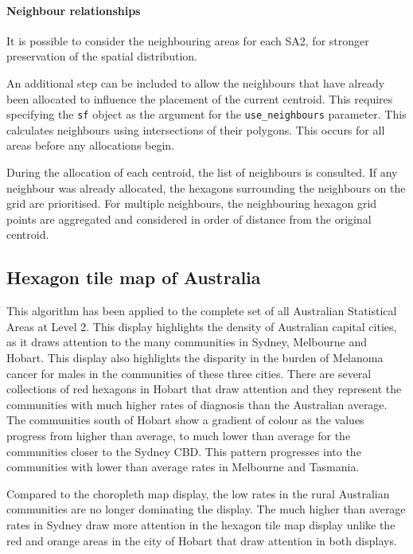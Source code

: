 \hypertarget{neighbour-relationships}{%
\paragraph{Neighbour relationships}\label{neighbour-relationships}}

It is possible to consider the neighbouring areas for each SA2, for
stronger preservation of the spatial distribution.

An additional step can be included to allow the neighbours that have
already been allocated to influence the placement of the current
centroid. This requires specifying the \texttt{sf} object as the
argument for the \texttt{use\_neighbours} parameter. This calculates
neighbours using intersections of their polygons. This occurs for all
areas before any allocations begin.

During the allocation of each centroid, the list of neighbours is
consulted. If any neighbour was already allocated, the hexagons
surrounding the neighbours on the grid are prioritised. For multiple
neighbours, the neighbouring hexagon grid points are aggregated and
considered in order of distance from the original centroid.

\hypertarget{hexagon-tile-map-of-australia}{%
\subsection{Hexagon tile map of
Australia}\label{hexagon-tile-map-of-australia}}

This algorithm has been applied to the complete set of all Australian
Statistical Areas at Level 2. This display highlights the density of
Australian capital cities, as it draws attention to the many communities
in Sydney, Melbourne and Hobart. This display also highlights the
disparity in the burden of Melanoma cancer for males in the communities
of these three cities. There are several collections of red hexagons in
Hobart that draw attention and they represent the communities with much
higher rates of diagnosis than the Australian average. The communities
south of Hobart show a gradient of colour as the values progress from
higher than average, to much lower than average for the communities
closer to the Sydney CBD. This pattern progresses into the communities
with lower than average rates in Melbourne and Tasmania.

Compared to the choropleth map display, the low rates in the rural
Australian communities are no longer dominating the display. The much
higher than average rates in Sydney draw more attention in the hexagon
tile map display unlike the red and orange areas in the city of Hobart
that draw attention in both displays.

